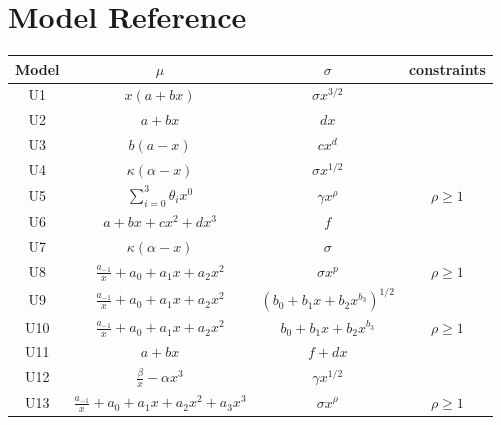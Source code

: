 \documentclass{article}
\begin{document}
\section{Model Reference}
\begin{table}[h!]
\begin{tabular}{|c|c|c|c|}
\hline
Model & $\mu$ & $\sigma$ & constraints\\
\hline
U1 & $x(a+bx)$ & $\sigma x^{3/2}$ & \\
\hline
U2 & $a+bx$ &$dx$& \\
\hline
U3 & $b(a-x)$ & $cx^d$& \\
\hline
U4 & $\kappa(\alpha-x)$ & $\sigma x^{1/2}$& \\
\hline
U5 & $\sum_{i=0}^3 \theta_ix^0$ & $\gamma x^{\rho}$& $\rho\geq 1$\\
\hline
U6 & $a+bx+cx^2+dx^3$ & $f$ & \\
\hline
U7 & $\kappa(\alpha-x)$ & $\sigma$ & \\
\hline
U8 & $\frac{a_{-1}}{x} + a_0 + a_1x+ a_2x^2$ & $\sigma x^p$ & $\rho\geq 1$\\
\hline
U9 & $\frac{a_{-1}}{x} + a_0 + a_1x+ a_2x^2$ & $(b_0 +b_1x+b_2x^{b_3})^{1/2}$ & \\
\hline
U10 & $\frac{a_{-1}}{x} + a_0 + a_1x+ a_2x^2$ & $b_0 +b_1x+b_2x^{b_3}$ & $\rho\geq 1$\\
\hline
U11 & $a+bx$ & $f+dx$ &\\
\hline
U12 & $\frac{\beta}{x}-\alpha x^3$ & $\gamma x^{1/2}$ & \\
\hline
U13 & $\frac{a_{-1}}{x} + a_0 + a_1x+ a_2x^2 +a_3x^3$ & $\sigma x^{\rho}$ & $\rho\geq 1$\\
\hline
\end{tabular}
\end{table}
\end{document}
